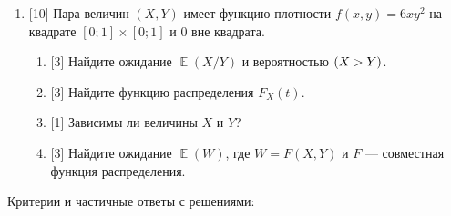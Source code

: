 \documentclass[12pt]{article}
\let\P\relax
\DeclareMathOperator{\P}{\mathbb{P}}
\DeclareMathOperator{\E}{\mathbb{E}}
\begin{document}
\begin{enumerate}
    \item {[10]} Пара величин $(X, Y)$ имеет функцию плотности $f(x, y) = 6xy^2$ на квадрате $[0;1]\times [0;1]$ и $0$ вне квадрата. 
    \begin{enumerate}
        \item {[3]} Найдите ожидание $\E(X/Y)$ и вероятностью $\P(X > Y)$.
        \item {[3]} Найдите функцию распределения $F_X(t)$.
        \item {[1]} Зависимы ли величины $X$ и $Y$?
        \item {[3]} Найдите ожидание $\E(W)$, где $W = F(X, Y)$ и $F$ — совместная функция распределения. 
    \end{enumerate}

\end{enumerate}

Критерии и частичные ответы с решениями:
\end{document}
